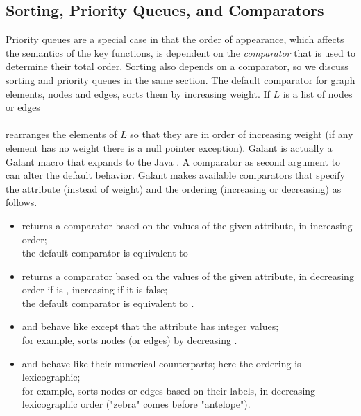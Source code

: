 \subsection{Sorting, Priority Queues, and Comparators} \label{sec:sorting}



Priority queues are a special case in that the order of appearance, which
affects the semantics of the key functions,
is dependent on the \emph{comparator} that is used to
determine their total order. Sorting also depends on a comparator, so we
discuss sorting and priority queues in the same section.
The default comparator for graph elements, nodes and edges, sorts them by
increasing weight. If $L$ is a list of nodes or edges\\
\hspace*{1em}\\
rearranges the elements of $L$ so that they are in order of increasing weight
(if any element has no weight there is a null pointer exception). Galant  is
actually a Galant macro that expands to the Java .
A comparator as second argument to  can alter the default
behavior. Galant makes available comparators that specify the attribute
(instead of weight) and the ordering (increasing or decreasing) as follows.
\begin{itemize}
  \item {} returns a comparator
    based on the values of the given attribute, in increasing order;\\
    the default comparator is equivalent to 
  \item {} returns a comparator
    based on the values of the given attribute, in decreasing order if
     is , increasing if it is false;\\
    the default comparator is equivalent to .
  \item {} and
     behave
    like  except that the attribute has integer
    values;\\
    for example, 
    sorts nodes (or edges) by decreasing .
  \item {} and
     behave like
    their numerical counterparts; here the ordering is lexicographic;\\
    for example,  sorts
    nodes or edges based on their labels, in decreasing lexicographic order
    ("zebra" comes before "antelope").
\end{itemize}
